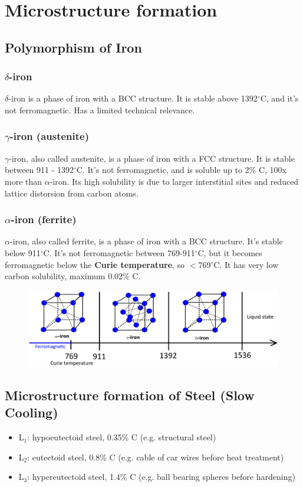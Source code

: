 \documentclass{article}
\begin{document}
\section{Microstructure formation}
\subsection{Polymorphism of Iron}
\subsubsection{$\delta$-iron}
$\delta$-iron is a phase of iron with a BCC structure. It is stable above 1392$^\circ$C, and
it's not ferromagnetic. Has a limited technical relevance.

\subsubsection{$\gamma$-iron (austenite)}
$\gamma$-iron, also called austenite, is a phase of iron with a FCC structure.
It is stable between 911 - 1392$^\circ$C. It's not ferromagnetic, and is soluble up
to 2\% C, 100x more than $\alpha$-iron. Its high solubility is due to larger interstitial
sites and reduced lattice distorsion from carbon atoms.

\subsubsection{$\alpha$-iron (ferrite)}
$\alpha$-iron, also called ferrite, is a phase of iron with a BCC structure.
It's stable below 911$^\circ$C. It's not ferromagnetic between 769-911$^\circ$C, but it
becomes ferromagnetic below the \textbf{Curie temperature}, so $<$769$^\circ$C.
It has very low carbon solubility, maximum 0.02\% C.

\begin{figure}[ht!]
  \centering
  \includegraphics[width=\textwidth]{media/iron_polymorphism.png}
\end{figure}

\newpage
\subsection{Microstructure formation of Steel (Slow Cooling)}
\begin{itemize}
  \item L$_1$: hypoeutectoid steel, 0.35\% C (e.g. structural steel)
  \item L$_2$: eutectoid steel, 0.8\% C (e.g. cable of car wires before heat treatment)
  \item L$_3$: hypereutectoid steel, 1.4\% C (e.g. ball bearing spheres before hardening)
\end{itemize}
\end{document}
